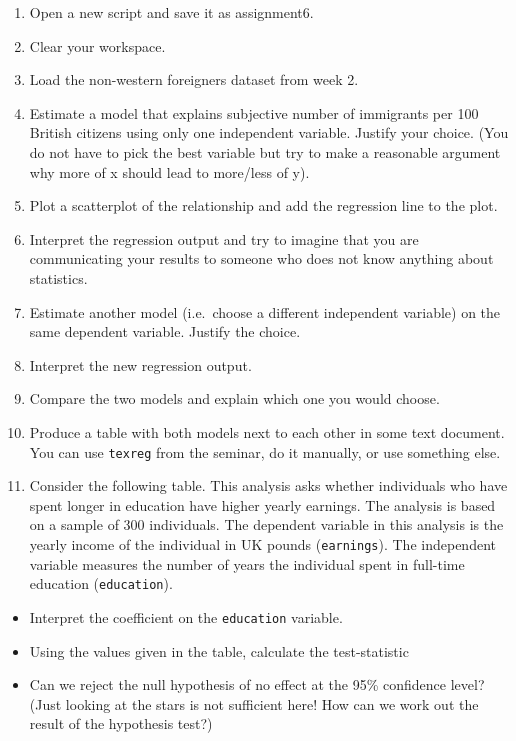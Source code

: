 \documentclass[]{article}
\providecommand{\tightlist}{%
  \setlength{\itemsep}{0pt}\setlength{\parskip}{0pt}}
\theoremstyle{definition}
\theoremstyle{definition}
\theoremstyle{definition}
\theoremstyle{remark}
\begin{document}
\begin{enumerate}
\def\labelenumi{\arabic{enumi}.}
\tightlist
\item
  Open a new script and save it as assignment6.
\item
  Clear your workspace.
\item
  Load the non-western foreigners dataset from week 2.
\item
  Estimate a model that explains subjective number of immigrants per 100
  British citizens using only one independent variable. Justify your
  choice. (You do not have to pick the best variable but try to make a
  reasonable argument why more of x should lead to more/less of y).
\item
  Plot a scatterplot of the relationship and add the regression line to
  the plot.
\item
  Interpret the regression output and try to imagine that you are
  communicating your results to someone who does not know anything about
  statistics.
\item
  Estimate another model (i.e.~choose a different independent variable)
  on the same dependent variable. Justify the choice.
\item
  Interpret the new regression output.
\item
  Compare the two models and explain which one you would choose.
\item
  Produce a table with both models next to each other in some text
  document. You can use \texttt{texreg} from the seminar, do it
  manually, or use something else.
\item
  Consider the following table. This analysis asks whether individuals
  who have spent longer in education have higher yearly earnings. The
  analysis is based on a sample of 300 individuals. The dependent
  variable in this analysis is the yearly income of the individual in UK
  pounds (\texttt{earnings}). The independent variable measures the
  number of years the individual spent in full-time education
  (\texttt{education}).
\end{enumerate}

\begin{itemize}
\tightlist
\item
  Interpret the coefficient on the \texttt{education} variable.
\item
  Using the values given in the table, calculate the test-statistic
\item
  Can we reject the null hypothesis of no effect at the 95\% confidence
  level? (Just looking at the stars is not sufficient here! How can we
  work out the result of the hypothesis test?)
\end{itemize}
\end{document}
